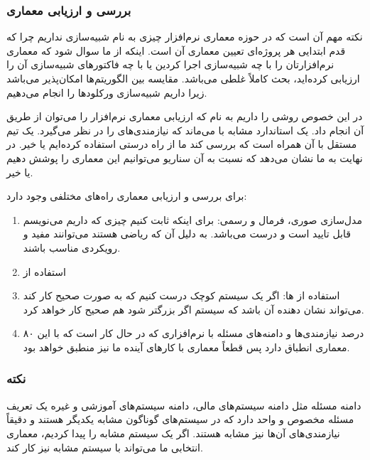 \subsubsection{بررسی و ارزیابی معماری}

نکته مهم آن است که در حوزه معماری نرم‌افزار چیزی به نام شبیه‌سازی نداریم چرا که
قدم ابتدایی هر پروژه‌ای تعیین معماری آن است. اینکه از ما سوال شود که معماری
نرم‌افزارتان را با چه شبیه‌سازی اجرا کردین یا با چه فاکتور‌های شبیه‌سازی آن را
ارزیابی کرده‌اید، بحث کاملاً غلطی می‌باشد. مقایسه بین الگوریتم‌ها امکان‌پذیر
می‌باشد زیرا داریم شبیه‌سازی ورکلود‌ها را انجام می‌دهیم.

در این خصوص روشی را داریم به نام  که ارزیابی معماری نرم‌افزار را
می‌توان از طریق آن انجام داد. یک استاندارد مشابه با  می‌ماند که
نیازمندی‌های  را در نظر می‌گیرد. یک تیم مستقل با آن همراه است
که بررسی کند ما از راه درستی استفاده کرده‌ایم یا خیر. در نهایت به ما نشان می‌دهد
که نسبت به آن سناریو می‌توانیم این معماری را پوشش دهیم یا خیر.

برای بررسی و ارزیابی معماری راه‌های مختلفی وجود دارد:

\begin{enumerate}
    \item مدل‌سازی صوری، فرمال و رسمی: برای اینکه ثابت کنیم چیزی که داریم
    می‌نویسم قابل تایید است و درست می‌باشد. به دلیل آن که ریاضی هستند می‌توانند
    مفید و رویکردی مناسب باشند.
    \item استفاده از 
    \item استفاده از ها: اگر یک سیستم کوچک درست کنیم که به
    صورت صحیح کار کند می‌تواند نشان دهنده آن باشد که سیستم اگر بزرگتر شود هم
    صحیح کار خواهد کرد.
    \item ۸۰ درصد نیازمندی‌ها و دامنه‌های مسئله با نرم‌افزاری که در حال کار است
    که با این معماری انطباق دارد پس قطعاً معماری با کار‌های آینده ما نیز منطبق
    خواهد بود.
\end{enumerate}

\subsubsection*{نکته}

دامنه مسئله مثل دامنه سیستم‌های مالی، دامنه سیستم‌های آموزشی و غیره یک تعریف
مسئله مخصوص و واحد دارد که در سیستم‌های گوناگون مشابه یکدیگر هستند و دقیقاً
نیازمندی‌های آن‌ها نیز مشابه هستند. اگر یک سیستم مشابه را پیدا کردیم، معماری
انتخابی ما می‌تواند با سیستم مشابه نیز کار کند.

